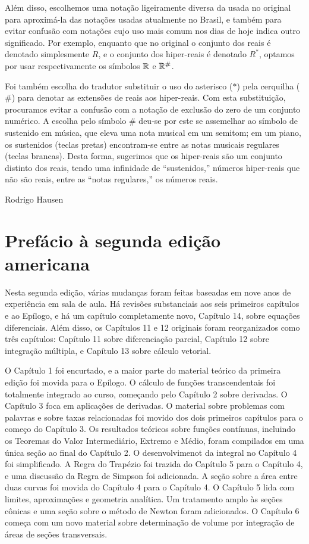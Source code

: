 \documentclass{svmono}
\begin{document}
Além disso, escolhemos uma notação ligeiramente diversa da usada no
original para aproximá-la das notações usadas atualmente no Brasil,
e também para evitar confusão com notações cujo uso mais comum
nos dias de hoje indica outro significado.
Por exemplo, enquanto que no original o conjunto dos reais é
denotado simplesmente $R$, e o conjunto dos hiper-reais é
denotado $R^*$, optamos por usar respectivamente os símbolos
$\mathbb{R}$ e ${\mathbb{R}}^\#$.

Foi também escolha do tradutor substituir o uso do asterisco ($*$)
pela cerquilha ($\#$) para denotar as extensões de reais aos hiper-reais.
Com esta substituição, procuramos evitar a confusão com a notação de
exclusão do zero de um conjunto numérico. A escolha pelo símbolo
$\#$ deu-se por este se assemelhar ao símbolo de sustenido em
música, que eleva uma nota musical em um semitom; em um piano,
os sustenidos (teclas pretas) encontram-se entre as notas musicais
regulares (teclas brancas). Desta forma, sugerimos que os
hiper-reais são um conjunto distinto dos reais, tendo uma infinidade
de ``sustenidos,'' números hiper-reais que não são reais, entre as
``notas regulares,'' os números reais.

\hfill Rodrigo Hausen

\newpage

\chapter*{Prefácio à segunda edição americana}

Nesta segunda edição, várias mudanças foram feitas baseadas em nove
anos de experiência em sala de aula. Há revisões substanciais aos seis
primeiros capítulos e ao Epílogo, e há um capítulo completamente novo,
Capítulo 14, sobre equações diferenciais. Além disso, os Capítulos 11
e 12 originais foram reorganizados como três capítulos: Capítulo 11
sobre diferenciação parcial, Capítulo 12 sobre integração múltipla, e
Capítulo 13 sobre cálculo vetorial.

O Capítulo 1 foi encurtado, e a maior parte do material teórico da
primeira edição foi movida para o Epílogo. O cálculo de funções
transcendentais foi totalmente integrado ao curso, começando pelo
Capítulo 2 sobre derivadas. O Capítulo 3 foca em aplicações de
derivadas. O material sobre problemas com palavras e sobre taxas
relacionadas foi movido dos dois primeiros capítulos para o começo
do Capítulo 3. Os resultados teóricos sobre funções contínuas,
incluindo os Teoremas do Valor Intermediário, Extremo e Médio,
foram compilados em uma única seção ao final do Capítulo 2. O
desenvolvimenot da integral no Capítulo 4 foi simplificado. A 
Regra do Trapézio foi trazida do Capítulo 5 para o Capítulo 4, e
uma discussão da Regra de Simpson foi adicionada. A seção sobre a
área entre duas curvas foi movida do Capítulo 4 para o Capítulo 4.
O Capítulo 5 lida com limites, aproximações e geometria analítica.
Um tratamento amplo às seções cônicas e uma seção sobre o método de
Newton foram adicionados. O Capítulo 6 começa com um novo material
sobre determinação de volume por integração de áreas de seções
transversais.
\end{document}

